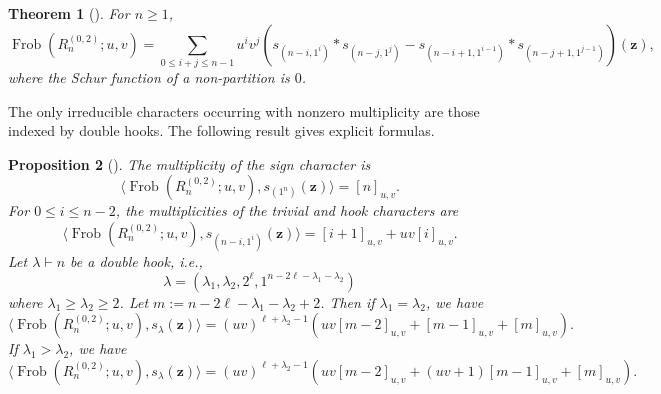 \documentclass[12pt]{amsart}
\theoremstyle{plain}
\newtheorem{theorem}{Theorem}[section]
\newtheorem{proposition}[theorem]{Proposition}
\theoremstyle{definition}
\DeclareMathOperator{\Frob}{Frob}
\newcommand{\z}{\mathbf{z}}
\begin{document}
\begin{theorem}[\cite{MR4381935}]\label{thm:KR-A02}
For $n\geq 1$,
    \begin{equation}
        \Frob(R_n^{(0,2)};u,v) = \sum_{0 \leq i+j \leq n-1} u^i v^j \left(s_{(n-i,1^i)}*s_{(n-j,1^j)} - s_{(n-i+1,1^{i-1})}*s_{(n-j+1,1^{j-1})} \right)(\z),
    \end{equation}
    where the Schur function of a non-partition is $0$.
\end{theorem}

The only irreducible characters occurring with nonzero multiplicity are those indexed by double hooks.
The following result gives explicit formulas.

\begin{proposition}[\cite{MR4381935,lentfer2026signcharactertriagonalfermionic}]\label{prop:02-all-characters}
The multiplicity of the sign character is
\begin{equation}
\langle \Frob(R_n^{(0,2)};u,v),s_{(1^n)}(\z) \rangle = [n]_{u,v}.
\end{equation}
For $0 \leq i \leq n-2$, the multiplicities of the trivial and hook characters are
\begin{equation}
\langle \Frob(R_n^{(0,2)};u,v),s_{(n-i,1^i)}(\z) \rangle = [i+1]_{u,v} + uv[i]_{u,v}.
\end{equation}
Let $\lambda \vdash n$ be a double hook, i.e., 
\begin{equation}
    \lambda = (\lambda_1, \lambda_2, 2^\ell, 1^{n-2\ell-\lambda_1-\lambda_2})
\end{equation} 
where $\lambda_1 \geq \lambda_2 \geq 2$.
Let $m := n - 2\ell - \lambda_1 - \lambda_2 + 2$. Then if $\lambda_1 = \lambda_2$, we have
\begin{equation}
\langle \Frob(R_n^{(0,2)};u,v),s_{\lambda}(\z) \rangle = (uv)^{\ell+\lambda_2-1} (uv[m-2]_{u,v} + [m-1]_{u,v} + [m]_{u,v}).
\end{equation}
If $\lambda_1 > \lambda_2$, we have
\begin{equation}
\langle \Frob(R_n^{(0,2)};u,v),s_{\lambda}(\z) \rangle = (uv)^{\ell+\lambda_2-1} (uv[m-2]_{u,v} + (uv+1)[m-1]_{u,v} + [m]_{u,v}).
\end{equation}
\end{proposition}
\end{document}
